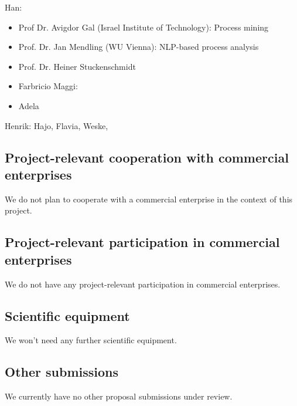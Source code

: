 Han:

\begin{itemize}
\item Prof Dr. Avigdor Gal (Israel Institute of Technology): Process mining
\item Prof. Dr. Jan Mendling (WU Vienna): NLP-based process analysis 
\item Prof. Dr. Heiner Stuckenschmidt 
\item Farbricio  Maggi:
\item Adela
\end{itemize}

Henrik: Hajo, Flavia, Weske, 


\subsection{Project-relevant cooperation with commercial enterprises}

We do not plan to cooperate with a commercial enterprise in the context of this project. 


\subsection{Project-relevant participation in commercial enterprises}

We do not have any project-relevant participation in commercial enterprises.  

\subsection{Scientific equipment}

We won't need any further scientific equipment. 

\subsection{Other submissions}

We currently have no other proposal submissions under review.  